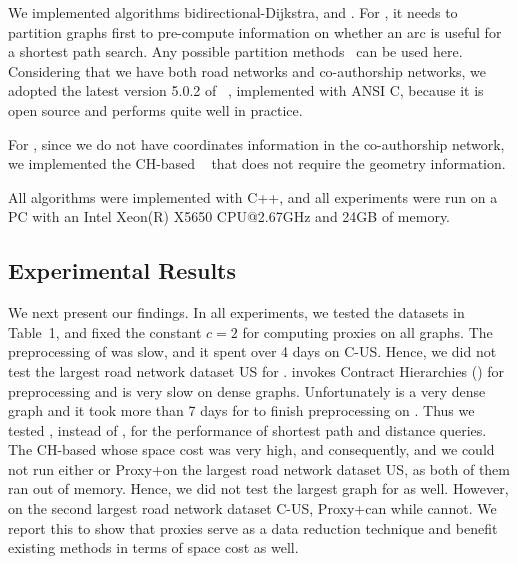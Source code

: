  We implemented algorithms bidirectional-Dijkstra, \arcflag and \tnr.
For \arcflag, it needs to partition graphs first to pre-compute information on whether an arc is useful for a shortest path search. Any possible partition methods~\cite{kl70,Karypis98,YangYZK12, delling2011graph} can be used here. Considering that we have both road networks and co-authorship networks, we adopted the latest version 5.0.2 of \metis~\cite{metis}, implemented with ANSI C, because it is open source and performs quite well in practice.

For \tnr, since we do not have coordinates information in the co-authorship network, we implemented the CH-based \tnr~\cite{arz2013transit} that does not require the geometry information.



 All algorithms were implemented with C++, and all experiments were run on a PC with an Intel Xeon(R) X5650 CPU@2.67GHz and 24GB of memory.





\subsection{Experimental Results}

We next present our findings. In all experiments, we tested the datasets in Table~1, and fixed the constant $c = 2$ for computing proxies on all graphs.
The preprocessing of \arcflag was slow, and it spent over 4 days on C-US. Hence, we did not test the largest road network dataset US for \arcflag.
\tnr invokes Contract Hierarchies (\ch) for preprocessing and \ch is very slow on dense graphs. Unfortunately \dblp is a very dense graph and it took more than 7 days for \ch to finish preprocessing on \dblp. Thus we tested \dblpone, instead of \dblp, for the performance of shortest path and distance queries.
The CH-based \tnr whose space cost was very high, and consequently, and we could not run either \tnr or Proxy+\tnr on the largest road network dataset US, as both of them ran out of memory. Hence, we did not test the largest graph for \tnr as well. However, on the second largest road network dataset C-US, Proxy+\tnr can while \tnr cannot. We report this to show that proxies serve as a data reduction technique and benefit existing methods in terms of space cost as well.




